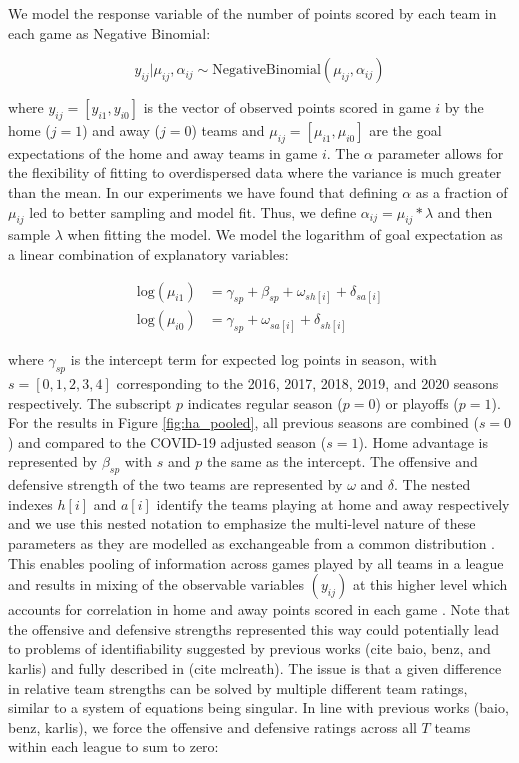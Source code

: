 We model the response variable of the number of points scored by each team in each game as Negative Binomial:

\begin{equation} \label{eq:likelihood}
y_{ij} | \mu_{ij}, \alpha_{ij} \sim \text{NegativeBinomial}(\mu_{ij}, \alpha_{ij})
\end{equation}

where \(y_{ij} = [y_{i1}, y_{i0}]\) is the vector of observed points scored in game \(i\) by the home (\(j=1\)) and away (\(j=0\)) teams and \(\mu_{ij} = [\mu_{i1}, \mu_{i0}]\) are the goal expectations of the home and away teams in game \(i\). The \(\alpha\) parameter allows for the flexibility of fitting to overdispersed data where the variance is much greater than the mean. In our experiments we have found that defining \(\alpha\) as a fraction of \(\mu_{ij}\) led to better sampling and model fit. Thus, we define \(\alpha_{ij} = \mu_{ij} * \lambda\) and then sample \(\lambda\) when fitting the model. We model the logarithm of goal expectation as a linear combination of explanatory variables:

\begin{equation} \label{eq:expected points}
\begin{split}
\text{log}(\mu_{i1}) &= \gamma_{sp} + \beta_{sp} + \omega_{sh[i]} + \delta_{sa[i]} \\
\text{log}(\mu_{i0}) &= \gamma_{sp} + \omega_{sa[i]} + \delta_{sh[i]}
\end{split}
\end{equation}

where \(\gamma_{sp}\) is the intercept term for expected log points in season, with \(s = [0, 1, 2, 3, 4]\) corresponding to the 2016, 2017, 2018, 2019, and 2020 seasons respectively. The subscript \(p\) indicates regular season (\(p=0\)) or playoffs (\(p=1\)). For the results in Figure \ref{fig:ha_pooled}, all previous seasons are combined (\(s=0\)) and compared to the COVID-19 adjusted season (\(s=1\)). Home advantage is represented by \(\beta_{sp}\) with \(s\) and \(p\) the same as the intercept. The offensive and defensive strength of the two teams are represented by \(\omega\) and \(\delta\). The nested indexes \(h[i]\) and \(a[i]\) identify the teams playing at home and away respectively and we use this nested notation to emphasize the multi-level nature of these parameters as they are modelled as exchangeable from a common distribution \cite{McElreath2020} \cite{Gelman2014} \cite{Gelman2006}. This enables pooling of information across games played by all teams in a league and results in mixing of the observable variables \((y_{ij})\) at this higher level which accounts for correlation in home and away points scored in each game \cite{Baio2010}. Note that the offensive and defensive strengths represented this way could potentially lead to problems of identifiability suggested by previous works (cite baio, benz, and karlis) and fully described in (cite mclreath). The issue is that a given difference in relative team strengths can be solved by multiple different team ratings, similar to a system of equations being singular. In line with previous works (baio, benz, karlis), we force the offensive and defensive ratings across all $T$ teams within each league to sum to zero:

